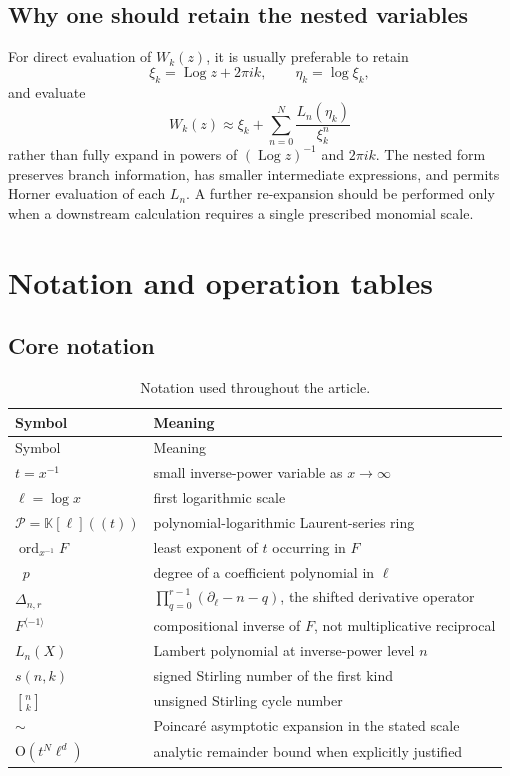 \documentclass[11pt,oneside]{article}
\numberwithin{equation}{section}
\theoremstyle{definition}
\newcommand{\K}{\mathbb K}
\newcommand{\PL}{\mathscr P}
\newcommand{\ordx}{\operatorname{ord}_{x^{-1}}}
\newcommand{\rev}{\langle -1\rangle}
\newcommand{\bigO}{\mathrm{O}}
\newcommand{\as}{\sim}
\newcommand{\StirlingFirst}[2]{\genfrac{[}{]}{0pt}{}{#1}{#2}}
\newcommand{\Log}{\operatorname{Log}}
\DeclareMathOperator{\degell}{deg_{\ell}}
\begin{document}
\subsection{Why one should retain the nested variables}

For direct evaluation of \(W_k(z)\), it is usually preferable to retain
\[
  \xi_k=\Log z+2\pi i k,
  \qquad \eta_k=\log\xi_k,
\]
and evaluate
\[
  W_k(z)\approx \xi_k+\sum_{n=0}^{N}\frac{L_n(\eta_k)}{\xi_k^n}
\]
rather than fully expand in powers of \((\Log z)^{-1}\) and \(2\pi i k\).
The nested form preserves branch information, has smaller intermediate
expressions, and permits Horner evaluation of each \(L_n\).  A further
re-expansion should be performed only when a downstream calculation requires a
single prescribed monomial scale.

\section{Notation and operation tables}\label{app:tables}

\subsection{Core notation}

\begin{longtable}{@{}p{}p{}@{}}
\caption{Notation used throughout the article.}\label{tab:notation}\\
\toprule
Symbol & Meaning\\
\midrule
\endfirsthead
\toprule
Symbol & Meaning\\
\midrule
\endhead
\(t=x^{-1}\) & small inverse-power variable as \(x\to\infty\)\\
\(\ell=\log x\) & first logarithmic scale\\
\(\PL=\K[\ell]((t))\) & polynomial-logarithmic Laurent-series ring\\
\(\ordx F\) & least exponent of \(t\) occurring in \(F\)\\
\(\degell p\) & degree of a coefficient polynomial in \(\ell\)\\
\(\Delta_{n,r}\) & \(\prod_{q=0}^{r-1}(\partial_\ell-n-q)\), the shifted derivative operator\\
\(F^{\rev}\) & compositional inverse of \(F\), not multiplicative reciprocal\\
\(L_n(X)\) & Lambert polynomial at inverse-power level \(n\)\\
\(s(n,k)\) & signed Stirling number of the first kind\\
\(\StirlingFirst{n}{k}\) & unsigned Stirling cycle number\\
\(\as\) & Poincar\'e asymptotic expansion in the stated scale\\
\(\bigO(t^N\ell^d)\) & analytic remainder bound when explicitly justified\\
\bottomrule
\end{longtable}
\end{document}
